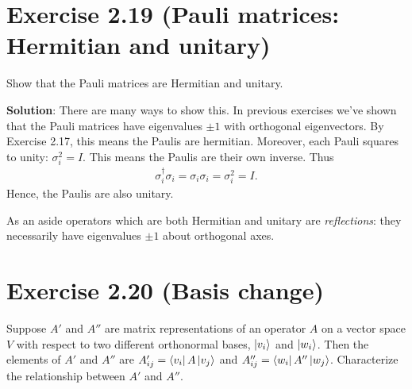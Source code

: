 \documentclass{book}
\begin{document}
\section*{Exercise 2.19 (Pauli matrices: Hermitian and unitary)}
    Show that the Pauli matrices are Hermitian and unitary.
    
    \textbf{Solution}: There are many ways to show this. In previous exercises we've shown that the Pauli matrices have eigenvalues $\pm 1$ with orthogonal eigenvectors. By Exercise 2.17, this means the Paulis are hermitian. Moreover, each Pauli squares to unity: $\sigma_i^2 = I$. This means the Paulis are their own inverse. Thus
    \begin{align}
        \sigma_i^\dagger \sigma_i = \sigma_i \sigma_i = \sigma_i^2 = I.
    \end{align}
    Hence, the Paulis are also unitary.
    
    As an aside operators which are both Hermitian and unitary are \emph{reflections}: they necessarily have eigenvalues $\pm 1$ about orthogonal axes.
    
\section*{Exercise 2.20 (Basis change)}
    Suppose $A'$ and $A''$ are matrix representations of an operator $A$ on a vector space $V$ with respect to two different orthonormal bases, $\ket{v_i}$ and $\ket{w_i}$. Then the elements of $A'$ and $A''$ are $A'_{ij} = \bra{v_i}A\ket{v_j}$ and $A''_{ij} = \bra{w_i}A''\ket{w_j}$. Characterize the relationship between $A'$ and $A''$.
    
\end{document}
